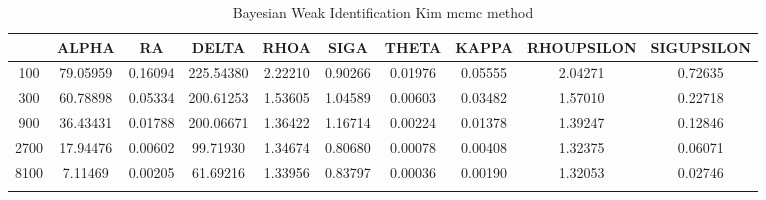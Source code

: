 \documentclass[a4paper,10pt]{article}
\begin{document}
\centering
\begin{longtable}{cccccccccc}
\toprule
 & ALPHA & RA & DELTA & RHOA & SIGA & THETA & KAPPA & RHOUPSILON & SIGUPSILON \\
\midrule
100 & 79.05959 & 0.16094 & 225.54380 & 2.22210 & 0.90266 & 0.01976 & 0.05555 & 2.04271 & 0.72635 \\
300 & 60.78898 & 0.05334 & 200.61253 & 1.53605 & 1.04589 & 0.00603 & 0.03482 & 1.57010 & 0.22718 \\
900 & 36.43431 & 0.01788 & 200.06671 & 1.36422 & 1.16714 & 0.00224 & 0.01378 & 1.39247 & 0.12846 \\
2700 & 17.94476 & 0.00602 & 99.71930 & 1.34674 & 0.80680 & 0.00078 & 0.00408 & 1.32375 & 0.06071 \\
8100 & 7.11469 & 0.00205 & 61.69216 & 1.33956 & 0.83797 & 0.00036 & 0.00190 & 1.32053 & 0.02746 \\
\bottomrule
\caption{Bayesian Weak Identification Kim mcmc method}
\label{table:tbl:WeakKim_mcmc}
\end{longtable}
\end{document}
